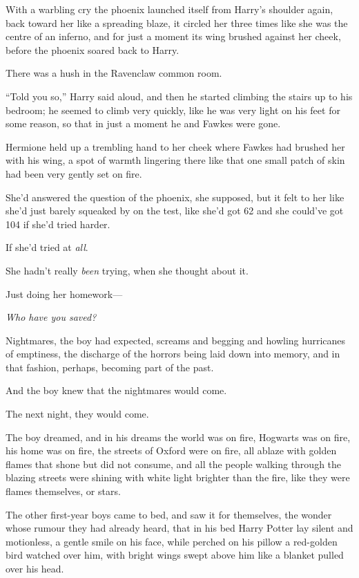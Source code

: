 With a warbling cry the phoenix launched itself from Harry’s shoulder again, back toward her like a spreading blaze, it circled her three times like she was the centre of an inferno, and for just a moment its wing brushed against her cheek, before the phoenix soared back to Harry.

There was a hush in the Ravenclaw common room.

“Told you so,” Harry said aloud, and then he started climbing the stairs up to his bedroom; he seemed to climb very quickly, like he was very light on his feet for some reason, so that in just a moment he and Fawkes were gone.

Hermione held up a trembling hand to her cheek where Fawkes had brushed her with his wing, a spot of warmth lingering there like that one small patch of skin had been very gently set on fire.

She’d answered the question of the phoenix, she supposed, but it felt to her like she’d just barely squeaked by on the test, like she’d got 62 and she could’ve got 104 if she’d tried harder.

If she’d tried at \emph{all}.

She hadn’t really \emph{been} trying, when she thought about it.

Just doing her homework—

\emph{Who have you saved?}


Nightmares, the boy had expected, screams and begging and howling hurricanes of emptiness, the discharge of the horrors being laid down into memory, and in that fashion, perhaps, becoming part of the past.

And the boy knew that the nightmares would come.

The next night, they would come.

The boy dreamed, and in his dreams the world was on fire, Hogwarts was on fire, his home was on fire, the streets of Oxford were on fire, all ablaze with golden flames that shone but did not consume, and all the people walking through the blazing streets were shining with white light brighter than the fire, like they were flames themselves, or stars.

The other first-year boys came to bed, and saw it for themselves, the wonder whose rumour they had already heard, that in his bed Harry Potter lay silent and motionless, a gentle smile on his face, while perched on his pillow a red-golden bird watched over him, with bright wings swept above him like a blanket pulled over his head.

